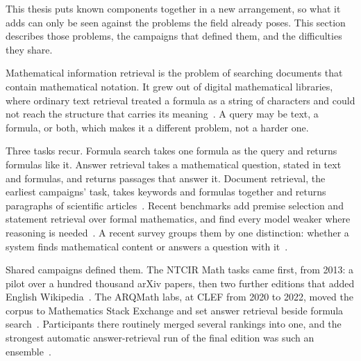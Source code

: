 %
%

This thesis puts known components together in a new arrangement, so what it adds can
only be seen against the problems the field already poses. This section describes those
problems, the campaigns that defined them, and the difficulties they share.

Mathematical information retrieval is the problem of searching documents that contain
mathematical notation. It grew out of digital mathematical libraries, where ordinary
text retrieval treated a formula as a string of characters and could not reach the
structure that carries its meaning~\cite{dadure2024mirreview}. A query may be text, a
formula, or both, which makes it a different problem, not a harder one.

Three tasks recur. Formula search takes one formula as the query and returns formulas
like it. Answer retrieval takes a mathematical question, stated in text and formulas,
and returns passages that answer it. Document retrieval, the earliest campaigns' task,
takes keywords and formulas together and returns paragraphs of scientific
articles~\cite{zanibbi2016ntcir12}. Recent benchmarks add premise selection and
statement retrieval over formal mathematics, and find every model weaker where
reasoning is needed~\cite{ju2025mirb}. A recent survey groups them by one distinction:
whether a system finds mathematical content or answers a question with
it~\cite{zanibbi2025mir}.

Shared campaigns defined them. The NTCIR Math tasks came first, from 2013: a pilot over
a hundred thousand arXiv papers, then two further editions that added English
Wikipedia~\cite{aizawa2020ntcirmath}. The ARQMath labs, at CLEF from 2020 to 2022, moved
the corpus to Mathematics Stack Exchange and set answer retrieval beside formula
search~\cite{zanibbi2020arqmath,mansouri2021arqmath2,mansouri2022arqmath3}. Participants
there routinely merged several rankings into one, and the strongest automatic
answer-retrieval run of the final edition was such an
ensemble~\cite{mansouri2022arqmath3}.

